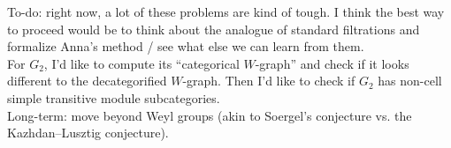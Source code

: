 \noindent To-do: right now, a lot of these problems are kind of tough. I think the best way to proceed would be to think about the analogue of standard filtrations and formalize Anna's method / see what else we can learn from them.\\

\noindent For $G_2$, I'd like to compute its ``categorical $W$-graph'' and check if it looks different to the decategorified $W$-graph. Then I'd like to check if $G_2$ has non-cell simple transitive module subcategories.\\

\noindent Long-term: move beyond Weyl groups (akin to Soergel's conjecture vs. the Kazhdan--Lusztig conjecture).
\newpage

\renewcommand\thesection{R}
\begingroup
\setlength{\emergencystretch}{.5em}
\printbibliography[heading=none]
\endgroup
\newpage



